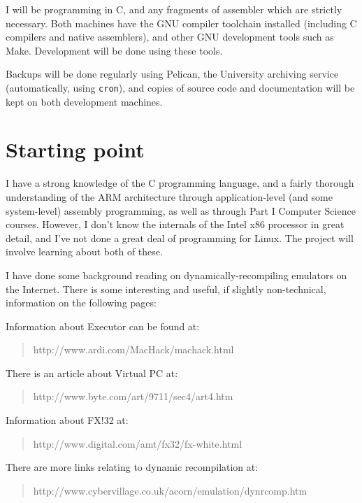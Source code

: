 I will be programming in C, and any fragments of assembler which are
strictly necessary. Both machines have the GNU compiler toolchain installed (including C compilers and native assemblers), and other GNU development tools such as Make. Development will be done using these tools.

Backups will be done regularly using Pelican, the University archiving service (automatically, using {\tt cron}), and copies of source code and documentation will be kept on both development machines.

\section*{Starting point}

I have a strong knowledge of the C programming language, and a fairly thorough understanding of the ARM architecture through application-level (and some system-level) assembly programming, as well as through Part I Computer Science courses. However, I don't know the internals of the Intel x86 processor in great detail, and I've not done a great deal of programming for Linux. The project will involve learning about both of these.

I have done some background reading on dynamically-recompiling emulators on the Internet. There is some interesting and useful, if slightly non-technical, information on the following pages:

Information about Executor can be found at:

\begin{quotation}http://www.ardi.com/MacHack/machack.html\end{quotation}

There is an article about Virtual PC at:

\begin{quotation}http://www.byte.com/art/9711/sec4/art4.htm\end{quotation}

Information about FX!32 at:

\begin{quotation}http://www.digital.com/amt/fx32/fx-white.html\end{quotation}

There are more links relating to dynamic recompilation at:

\begin{quotation}http://www.cybervillage.co.uk/acorn/emulation/dynrcomp.htm\end{quotation}

